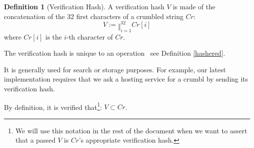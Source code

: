 \documentclass[twoside,twocolumn]{article}
\theoremstyle{definition}
\newtheorem{definition}{Definition}
\theoremstyle{remark}
\begin{document}
\begin{definition}[Verification Hash]
    \label{verificationHash}
    A verification hash $V$ is made of the concatenation of the 32 first characters of a crumbled string $Cr$:
    \begin{equation}
        \label{eq:verificationHash}
        V := \mathbin\Vert_{i=1}^{32} Cr[i]
    \end{equation}
    where $Cr[i]$ is the $i$-th character of $Cr$.

    The verification hash is unique to an operation \textemdash~see Definition \ref{hashered}.

    It is generally used for search or storage purposes. For example, our latest implementation requires that we ask a hosting service for a crumbl by 
    sending its verification hash.

    By definition, it is verified that\footnote{We will use this notation in the rest of the document when we want to assert that a passed $V$ is $Cr$'s 
    appropriate verification hash.}: $V \subset Cr$.
\end{definition}



%
%

\end{document}
